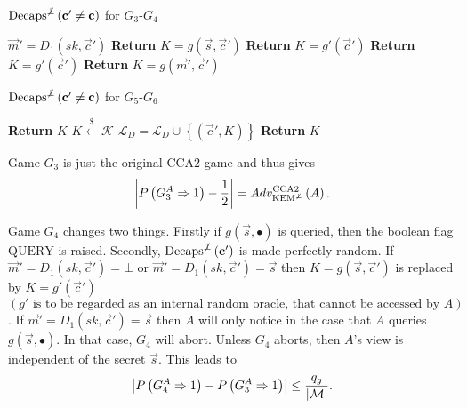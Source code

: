 \begin{center}
\begin{minipage}[ht!]{0.6\textwidth}
	\begin{algorithm}[H]
		\centering
		\caption{$\mathrm{Decaps}^{\not\bot}\left(\vec{c}' \neq \vec{c}\right)$ for $G_3$-$G_4$}
		\label{alg:decapsForG3ToG4}
		\begin{algorithmic}
			\State $\vec{m}' = D_1\left(sk, \vec{c}'\right)$
			 
				\State \textbf{Return} $K = g\left(\vec{s}, \vec{c}'\right)$ 
			\EndIf {}
			 
				\State \textbf{Return} $K = g'\left(\vec{c}'\right)$ 
			\EndIf {}
			 
				\State \textbf{Return} $K = g'\left(\vec{c}'\right)$ 
			\EndIf {}
			\State \textbf{Return} $K = g\left(\vec{m}', \vec{c}'\right)$
		\end{algorithmic}
	\end{algorithm}
\end{minipage}
\end{center}
\begin{center}
\begin{minipage}[ht!]{0.6\textwidth}
	\begin{algorithm}[H]
		\centering
		\caption{$\mathrm{Decaps}^{\not\bot}\left(\vec{c}' \neq \vec{c}\right)$ for $G_5$-$G_6$}
		\label{alg:decapsForG5ToG6}
		\begin{algorithmic}
			\If{$\exists K \ : \ \left(\vec{c}', K\right) \in \mathcal{L}_D$}
				\State \textbf{Return} $K$
			\Else
				\State $K \xleftarrow{\$} \mathcal{K}$
				\State $\mathcal{L}_D = \mathcal{L}_D \cup \left\{ \left(\vec{c}', K\right) \right\}$
				\State \textbf{Return} $K$
			\EndIf
		\end{algorithmic}
	\end{algorithm}
\end{minipage}
\end{center}

Game $G_3$ is just the original $\mathrm{CCA}2$ game and thus gives
\[
	\abs{P\left( G_3^A \Rightarrow 1 \right) - \frac{1}{2}} = Adv_{\mathrm{KEM}^{\not\bot}}^{\mathrm{CCA}2}\left(A\right).
\]
	
Game $G_4$ changes two things. Firstly if $g\left(\vec{s}, \bullet\right)$ is queried, then the boolean flag $\mathrm{QUERY}$ is raised. Secondly, $\mathrm{Decaps}^{\not\bot}\left(\vec{c}'\right)$ is made perfectly random. If $\vec{m}' = D_1\left(sk, \vec{c}'\right) = \bot$ or $\vec{m}' = D_1\left(sk, \vec{c}'\right) = \vec{s}$ then $K = g\left(\vec{s}, \vec{c}'\right)$ is replaced by $K = g'\left(\vec{c}'\right)$ $\left(g'\text{ is to be regarded as an internal random oracle, that cannot be accessed by }A\right)$. If $\vec{m}' = D_1\left(sk, \vec{c}'\right) = \vec{s}$ then $A$ will only notice in the case that $A$ queries $g\left(\vec{s}, \bullet\right)$. In that case, $G_4$ will abort. Unless $G_4$ aborts, then $A$'s view is independent of the secret $\vec{s}$. This leads to
\[
	\abs{P\left( G_4^A \Rightarrow 1 \right) - P\left( G_3^A \Rightarrow 1 \right) } \leq \frac{q_g}{\size{\mathcal{M}}}.
\]

